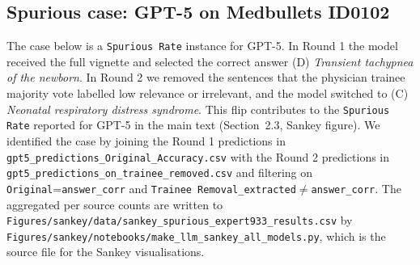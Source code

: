 \documentclass[11pt]{article}
\providecommand{\ourmetric}{\texttt{Spurious Rate}\xspace}
\begin{document}
\subsection{Spurious case: GPT-5 on Medbullets ID0102}
\label{sample:gpt5_spurious}

The case below is a \ourmetric instance for GPT-5. In Round 1 the model received the full vignette and selected the correct answer (D) \textit{Transient tachypnea of the newborn}. In Round 2 we removed the sentences that the physician trainee majority vote labelled low relevance or irrelevant, and the model switched to (C) \textit{Neonatal respiratory distress syndrome}. This flip contributes to the \ourmetric reported for GPT-5 in the main text (Section~2.3, Sankey figure). We identified the case by joining the Round 1 predictions in \texttt{gpt5\_predictions\_Original\_Accuracy.csv} with the Round 2 predictions in \texttt{gpt5\_predictions\_on\_trainee\_removed.csv} and filtering on \texttt{Original}=\texttt{answer\_corr} and \texttt{Trainee Removal\_extracted}$\neq$\texttt{answer\_corr}. The aggregated per source counts are written to \texttt{Figures/sankey/data/\allowbreak sankey\_spurious\_expert933\_results.csv} by \texttt{Figures/sankey/\allowbreak notebooks/make\_llm\_sankey\_all\_models.py}, which is the source file for the Sankey visualisations.
\end{document}
